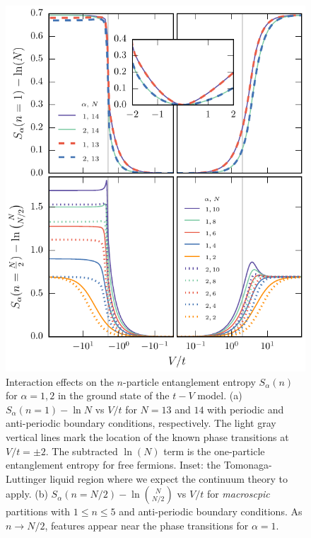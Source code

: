 \begin{figure}[h!]
\begin{center}
\includegraphics[scale = 1.0]{Chapters/EntropiesFigure.pdf}
\end{center}
\caption{Interaction effects on the $n$-particle entanglement entropy
$S_\alpha(n)$ for $\alpha=1,2$ in the ground state of the $t-V$ model. (a)
$S_{\alpha}(n=1)-\ln N$ vs $V/t$ for $N=13$ and $14$ with periodic and
anti-periodic boundary conditions, respectively. The light gray vertical lines
mark the location of the known phase transitions at $V/t=\pm 2$. The
subtracted $\ln (N)$ term is the one-particle entanglement
entropy for free fermions.  Inset: the Tomonaga-Luttinger liquid
region where we expect the continuum theory to apply. (b)
$S_{\alpha}(n=N/2)-\ln \binom{N}{N/2}$ vs
$V/t$ for \emph{macroscpic} partitions with $1\le n\le5$ and anti-periodic
boundary conditions. As $n \to N/2$, features appear near the phase transitions
for $\alpha=1$.} 
\label{fig:EntropiesFigure} 
\end{figure}
